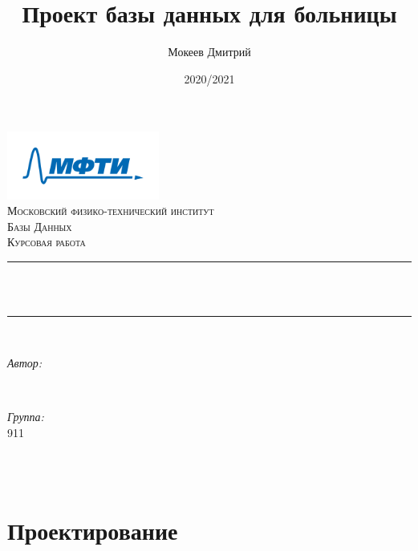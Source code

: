 \documentclass[12pt]{article}
\title{Проект базы данных для больницы}
\author{Мокеев Дмитрий}
\date{2020/2021}
\makeatletter
\let\thetitle\@title
\let\theauthor\@author
\let\thedate\@date
\makeatother
\begin{document}
	\begin{titlepage}
		\centering
		\vspace*{0.5 cm}
		\includegraphics[width=5cm]{mipt_rus.png}\\[1.0 cm]	
		\textsc{\LARGE Московский физико-технический институт}\\[2.0 cm]	%
		\textsc{\Large Базы Данных}\\[0.5 cm]				%
		\textsc{\large Курсовая работа}\\[0.5 cm]				%
		\rule{\linewidth}{0.2 mm} \\[0.4 cm]
		{ \huge \bfseries \thetitle}\\
		\rule{\linewidth}{0.2 mm} \\[1.5 cm]
		
		\begin{minipage}{0.4\textwidth}
			\begin{flushleft} \large
				\emph{Автор:}\\
				\theauthor
			\end{flushleft}
		\end{minipage}~
		\begin{minipage}{0.4\textwidth}
			\begin{flushright} \large
				\emph{Группа:} \\
				911									%
			\end{flushright}
		\end{minipage}\\[2 cm]
		
		{\large \thedate}\\[2 cm]
		
		\vfill
		
	\end{titlepage}

	\section{Проектирование}
\end{document}
